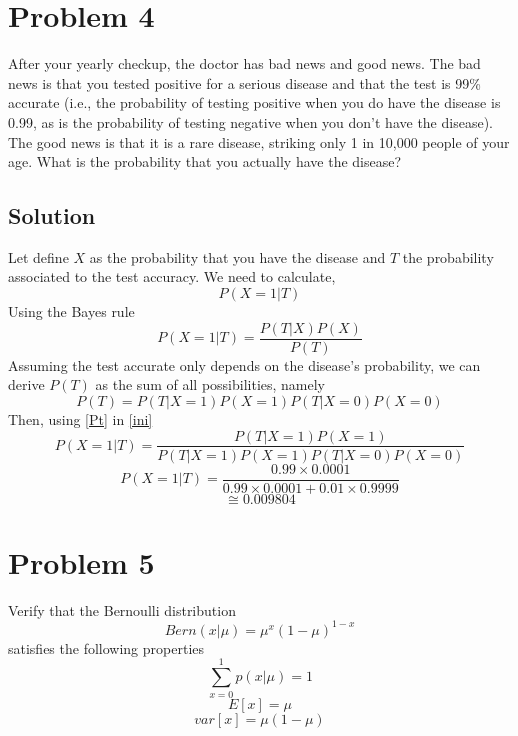 \documentclass[a4 paper]{article}
\numberwithin{equation}{section}
\newcommand{\0}{\mathbf{0}}
\begin{document}
\section*{Problem 4}
After your yearly checkup, the doctor has bad news and good news. The bad news is that you tested positive for a serious disease and that the test is 99\% accurate (i.e., the probability of testing positive when you do have the disease is 0.99, as is the probability of testing negative when you don’t have the disease). The good news is that it is a rare disease, striking only 1 in 10,000 people of your age. What is the probability that you actually have the disease? 
\subsection*{Solution}
Let define $X$ as the probability that you have the disease and $T$ the probability associated to the test accuracy. We need to calculate, 
\begin{equation}
P(X=1|T)
\end{equation}
Using the Bayes rule
\begin{equation}\label{ini}
P(X=1|T) = \frac{P(T|X)P(X)}{P(T)}
\end{equation}
Assuming the test accurate only depends on the disease's probability, we can derive $P(T)$ as the sum of all possibilities, namely
\begin{equation}\label{Pt}
P(T) = P(T|X=1)P(X=1)P(T|X=0)P(X=0)
\end{equation}
Then, using \ref{Pt} in \ref{ini}
\begin{equation}
P(X=1|T) = \frac{P(T|X=1)P(X=1)}{P(T|X=1)P(X=1)P(T|X=0)P(X=0)}
\end{equation}
\begin{equation}
P(X=1|T) = \frac{0.99\times 0.0001}{0.99\times 0.0001+0.01\times0.9999}
\end{equation}
\begin{equation}
\cong 0.009804
\end{equation}

\section*{Problem 5}
Verify that the Bernoulli distribution 
\begin{equation}\label{bern}
Bern(x|\mu) = \mu^x(1-\mu)^{1-x}
\end{equation}
satisfies the following properties 
\begin{equation}
\sum_{x=0}^1p(x|\mu) = 1
\end{equation}
\begin{equation}
E[x] = \mu
\end{equation}
\begin{equation}
var[x] = \mu(1-\mu)
\end{equation}
\end{document}

